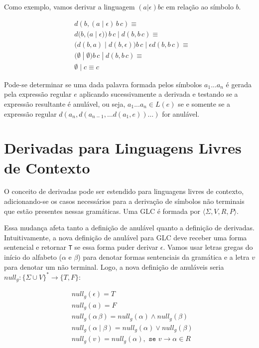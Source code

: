 Como exemplo, vamos derivar a linguagem $(a|\epsilon)bc$ em relação ao símbolo $b$.

\begin{align*}
    & d(b,(a\;|\;\epsilon)\,b\,c) \equiv \\
    & d(b,(a\;|\;\epsilon))\,b\,c \;|\; d(b,b\,c) \equiv\\
    & (d(b,a)\;|\;d(b,\epsilon))b\,c \;|\; \epsilon d(b,b\,c) \equiv\\
    & (\emptyset \;|\; \emptyset)b\,c \;|\; d(b,b\,c) \equiv\\
    & \emptyset \;|\; c \equiv c
\end{align*}

Pode-se determinar se uma dada palavra formada pelos símbolos $a_1...a_n$ é gerada pela expressão regular $e$ aplicando sucessivamente a derivada e testando se a expressão resultante é anulável, ou seja, $a_1...a_n \in L(e)$ se e somente se a expressão regular $d(a_n, d(a_{n-1}, \ldots d(a_1,e))\ldots )$ for anulável.


\section{Derivadas para Linguagens Livres de Contexto}

O conceito de derivadas pode ser estendido para linguagens livres de contexto, adicionando-se os casos necessários para a derivação de símbolos não terminais que estão presentes nessas gramáticas. Uma GLC é formada por $\langle \Sigma, V, R, P \rangle$.

Essa mudança afeta tanto a definição de anulável quanto a definição de derivadas. Intuitivamente, a nova definição de anulável para GLC deve receber uma forma sentencial e retornar \texttt{T} se essa forma puder derivar $\epsilon$. Vamos usar letras gregas do início do alfabeto ($\alpha$ e $\beta$) para denotar formas sentenciais da gramática e a letra $v$ para denotar um não terminal. Logo, a nova definição de anuláveis seria $null_g :\{\Sigma \cup V\}^* \to \{T,F\}$:

\begin{align*}
    & null_g(\epsilon)  =  T\\
    & null_g(a)  =  F\\
    & null_g(\alpha \, \beta)  =  null_g(\alpha) \wedge null_g(\beta)\\
    & null_g(\alpha \;|\; \beta)  =  null_g(\alpha) \vee null_g(\beta)\\
    & null_g(v)  =  null_g(\alpha), \texttt{ se } v \to \alpha \in R
\end{align*}

